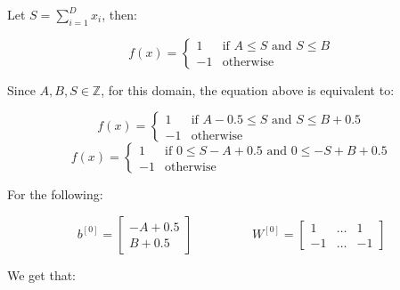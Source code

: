 \documentclass[12pt]{article}
\begin{document}
\begin{itemize}
        Let $ S = \sum_{i=1}^{D} x_i $, then:

        \begin{equation*}
            f(x) =
            \begin{cases}
                1 & \text{if } A \leq S \text{ and } S \leq B \\
                -1 & \text{otherwise}
            \end{cases}
        \end{equation*}

        Since $A,B,S \in \mathbb{Z}$, for this domain, the equation above is equivalent to:

        \begin{equation*}
            f(x) =
            \begin{cases}
                1 & \text{if } A-0.5 \leq S \text{ and } S \leq B+0.5 \\
                -1 & \text{otherwise}
            \end{cases}
        \end{equation*}
        \begin{equation}
            f(x) =
            \begin{cases}
                1 & \text{if } 0 \leq S -A+0.5 \text{ and } 0 \leq -S+B+0.5 \\
                -1 & \text{otherwise}
            \end{cases}
            \label{directly-derived-smallerthans}
        \end{equation}

        For the following:

        \[
            b^{[0]} = \begin{bmatrix}
                -A+0.5 \\
                B+0.5
            \end{bmatrix}
            \hspace{2cm}
            W^{[0]} = \begin{bmatrix}
                1 & \hdots & 1 \\
                -1 & \hdots & -1
            \end{bmatrix}
        \]

        We get that:


\end{itemize}
\end{document}
